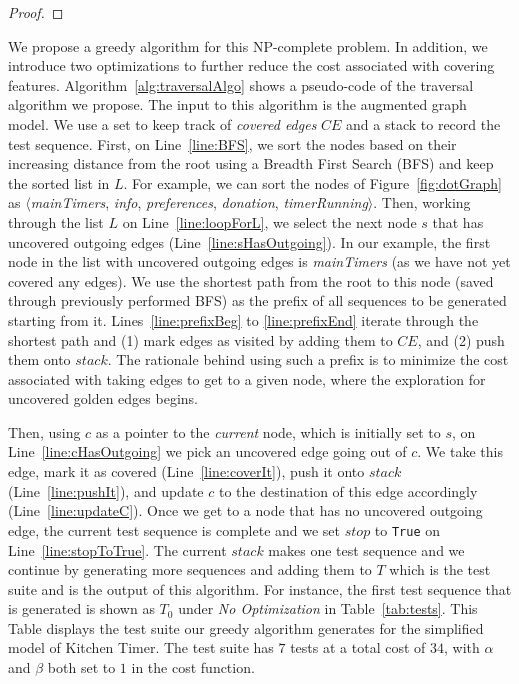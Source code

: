 \begin{proof}
\end{proof}

We propose a greedy algorithm for this NP-complete problem. In addition, we introduce two optimizations to further reduce the cost associated with covering features. Algorithm~\ref{alg:traversalAlgo} shows a pseudo-code of the traversal algorithm we propose. The input to this algorithm is the augmented graph model. We use a set to keep track of \emph{covered edges} $CE$ and a stack to record the test sequence. First, on Line~\ref{line:BFS}, we sort the nodes based on their increasing distance from the root using a Breadth First Search (BFS) and keep the sorted list in $L$. For example, we can sort the nodes of Figure~\ref{fig:dotGraph} as $\langle$\emph{mainTimers}, \emph{info}, \emph{preferences}, \emph{donation}, \emph{timerRunning}$\rangle$. Then, working through the list $L$ on Line~\ref{line:loopForL}, we select the next node $s$ that has uncovered outgoing edges (Line~\ref{line:sHasOutgoing}). In our example, the first node in the list with uncovered outgoing edges is \emph{mainTimers} (as we have not yet covered any edges). We use the shortest path from the root to this node (saved through previously performed BFS) as the prefix of all sequences to be generated starting from it. Lines~\ref{line:prefixBeg} to \ref{line:prefixEnd} iterate through the shortest path and (1) mark edges as visited by adding them to $CE$, and (2) push them onto $stack$. The rationale behind using such a prefix is to minimize the cost associated with taking edges to get to a given node, where the exploration for uncovered golden edges begins. %

%


Then, using $c$ as a pointer to the \emph{current} node, which is initially set to $s$, on Line~\ref{line:cHasOutgoing} we pick an uncovered edge going out of $c$. We take this edge, mark it as covered (Line~\ref{line:coverIt}), push it onto $stack$ (Line~\ref{line:pushIt}), and update $c$ to the destination of this edge accordingly (Line~\ref{line:updateC}). Once we get to a node that has no uncovered outgoing edge, the current test sequence is complete and we set $stop$ to {\small\texttt{True}} on Line~\ref{line:stopToTrue}. The current $stack$ makes one test sequence and we continue by generating more sequences and adding them to $T$ which is the test suite and is the output of this algorithm. For instance, the first test sequence that is generated is shown as $T_0$ under \emph{No Optimization} in Table~\ref{tab:tests}. This Table displays the test suite our greedy algorithm generates for the simplified model of Kitchen Timer. The test suite has $7$ tests at a total cost of $34$, with $\alpha$ and $\beta$ both set to $1$ in the cost function.

